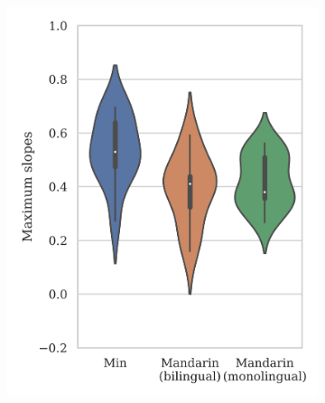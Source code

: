 \documentclass[12pt]{report}
\begin{document}
\begin{CJK}{UTF8}{bsmi}
\begin{figure}[hbt!]
\centering
\begin{subfigure}[b]{.49\textwidth}
\centering
\includegraphics[width=\textwidth]{Figures/E3/Result_51_advanced.png}
\end{subfigure}
\hfill
\begin{subfigure}[b]{.49\textwidth}
\centering

\end{subfigure}
\end{figure}
\end{CJK}
\end{document}
